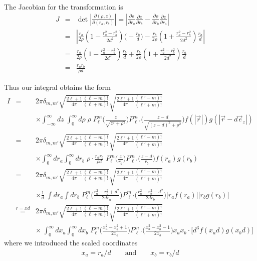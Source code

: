 \documentclass[11pt,a4paper]{report}
\begin{document}
The Jacobian for the transformation is
\begin{eqnarray*}
J&=&\det\left|\frac{\partial (\rho,z)}{\partial(r_a,r_b)}\right|
=\left|\frac{\partial\rho}{\partial r_a}\frac{\partial z}{\partial r_b}
-\frac{\partial\rho}{\partial r_b}\frac{\partial z}{\partial r_a}
\right|
\\
&=&\left|\frac{r_a}{2\rho}\left(1-\frac{r_a^2-r_b^2}{2d^2}\right)
\biggl(-\frac{r_b}{d}\biggr)
-\frac{r_b}{2\rho}\left(1+\frac{r_a^2-r_b^2}{2d^2}\right)
\frac{r_a}{d}\right|
\\
&=&\frac{r_a}{2\rho}\left(1-\frac{r_a^2-r_b^2}{2d^2}\right)
\frac{r_b}{d}+\frac{r_b}{2\rho}
\left(1+\frac{r_a^2-r_b^2}{2d^2}\right)
\frac{r_a}{d}
\\
&=&\frac{r_ar_b}{\rho d}
\end{eqnarray*}

Thus our integral obtains the form
\begin{eqnarray*}
I&=&
2\pi\delta_{m,m'}
\sqrt{\frac{2\ell+1}{4\pi}\frac{(\ell-m)!}{(\ell+m)!}}
\sqrt{\frac{2\ell'+1}{4\pi}\frac{(\ell'-m)!}{(\ell'+m)!}}
\\
&&\times\int_{-\infty}^\infty dz\;
\int_0^\infty d\rho\;\rho\; 
P^{m}_\ell\biggl(\frac{z}{\sqrt{z^2+\rho^2}}\biggr)
P^{m}_{\ell\,'}\biggl(\frac{z-d}{\sqrt{(z-d)^2+\rho^2}}\biggr)
f(|\vec{r}|)g(|\vec{r}-d\vec{e}_z|)
\\
&=&2\pi\delta_{m,m'}
\sqrt{\frac{2\ell+1}{4\pi}\frac{(\ell-m)!}{(\ell+m)!}}
\sqrt{\frac{2\ell'+1}{4\pi}\frac{(\ell'-m)!}{(\ell'+m)!}}
\\
&&\times\int_0^\infty dr_a\int_0^\infty dr_b\;
\rho\cdot\frac{r_ar_b}{\rho d}\; 
P^{m}_\ell\biggl(\frac{z}{r_a}\biggr)
P^{m}_{\ell\,'}\biggl(\frac{z-d}{r_b}\biggr)
f(r_a)g(r_b)
\\
&=&2\pi\delta_{m,m'}
\sqrt{\frac{2\ell+1}{4\pi}\frac{(\ell-m)!}{(\ell+m)!}}
\sqrt{\frac{2\ell'+1}{4\pi}\frac{(\ell'-m)!}{(\ell'+m)!}}
\\
&&\times\frac{1}{d}\; 
\int dr_a\int dr_b\;
P^{m}_\ell\biggl(\frac{r_a^2-r_b^2+d^2}{2dr_a}\biggr)
P^{m}_{\ell\,'}\biggl(\frac{r_a^2-r_b^2-d^2}{2dr_b}\biggr)
\biggl[r_af(r_a)\biggr]\biggl[r_bg(r_b)\biggr]
\\
&\stackrel{r=xd}{=}&2\pi\delta_{m,m'}
\sqrt{\frac{2\ell+1}{4\pi}\frac{(\ell-m)!}{(\ell+m)!}}
\sqrt{\frac{2\ell'+1}{4\pi}\frac{(\ell'-m)!}{(\ell'+m)!}}
\\
&&\times\; 
\int_0^\infty dx_a\int_0^\infty dx_b\;
P^{m}_\ell\biggl(\frac{x_a^2-x_b^2+1}{2x_a}\biggr)
P^{m}_{\ell\,'}\biggl(\frac{x_a^2-x_b^2-1}{2x_b}\biggr)
x_ax_b\cdot\biggl[d^3f(x_ad)g(x_bd)\biggr]
\end{eqnarray*}
where we introduced the scaled coordinates
\begin{eqnarray*}
x_a=r_a/d \qquad\text{and}\qquad x_b=r_b/d
\end{eqnarray*}
\end{document}
